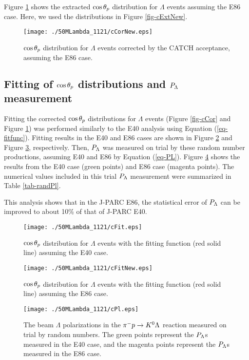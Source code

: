 Figure \ref{fig-cCorNew} shows the extracted $\cos{\theta_p}$ distribution for $\Lambda$ events assuming the E86 case. Here, we used the distributions in Figure \ref{fig-cExtNew}. 

\begin{figure}[h]
  \centering
  \texttt{[image: ./50MLambda\_1121/cCorNew.eps]}
  \caption{$\cos{\theta_p}$ distribution for $\Lambda$ events corrected by the CATCH acceptance, assuming the E86 case.}
  \label{fig-cCorNew}
\end{figure}


\subsection{Fitting of $\cos{\theta_p}$ distributions and $P_{\Lambda}$ measurement}
\label{subsec-randfit}

Fitting the corrected $\cos{\theta_p}$ distributions for $\Lambda$ events (Figure \ref{fig-cCor} and Figure \ref{fig-cCorNew}) was performed similarly to the E40 analysis using Equation (\ref{eq-fitfunc}). Fitting results in the E40 and E86 cases are shown in Figure \ref{fig-cFit} and Figure \ref{fig-cFitNew}, respectively. Then, $P_{\Lambda}$ was measured on trial by these random number productions, assuming E40 and E86 by Equation (\ref{eq-PL}). Figure \ref{fig-cPl} shows the results from the E40 case (green points) and E86 case (magenta points). The numerical values included in this trial $P_{\Lambda}$ measurement were summarized in Table \ref{tab-randPl}.

This analysis shows that in the J-PARC E86, the statistical error of $P_{\Lambda}$ can be improved to about 10\% of that of J-PARC E40.

\begin{figure}[h]
  \centering
  \texttt{[image: ./50MLambda\_1121/cFit.eps]}
  \caption{$\cos{\theta_p}$ distribution for $\Lambda$ events with the fitting function (red solid line) assuming the E40 case.}
  \label{fig-cFit}
\end{figure}

\begin{figure}[h]
  \centering
  \texttt{[image: ./50MLambda\_1121/cFitNew.eps]}
  \caption{$\cos{\theta_p}$ distribution for $\Lambda$ events with the fitting function (red solid line) assuming the E86 case.}
  \label{fig-cFitNew}
\end{figure}

\begin{figure}[h]
  \centering
  \texttt{[image: ./50MLambda\_1121/cPl.eps]}
  \caption{The beam $\Lambda$ polarizations in the $\pi^- p \to K^0 \Lambda$ reaction measured on trial by random numbers. The green points represent the $P_{\Lambda}$s measured in the E40 case, and the magenta points represent the $P_{\Lambda}$s measured in the E86 case.}
  \label{fig-cPl}
\end{figure}

